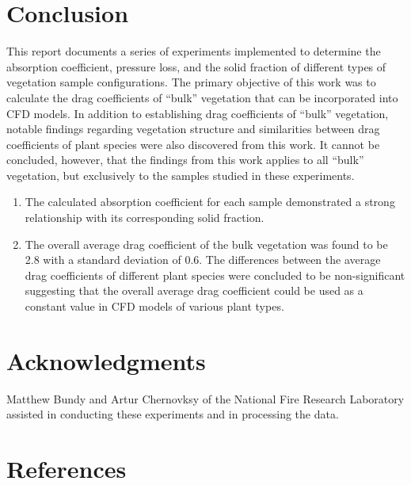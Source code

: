 \documentclass[12pt]{article}
\begin{document}
\section*{Conclusion}
This report documents a series of experiments implemented to determine the absorption coefficient, pressure loss, and the solid fraction of different types of vegetation sample configurations. The primary objective of this work was to calculate the drag coefficients of ``bulk'' vegetation that can be incorporated into CFD models. In addition to establishing drag coefficients of ``bulk''  vegetation, notable findings regarding vegetation structure and similarities between drag coefficients of plant species were also discovered from this work. It cannot be concluded, however, that the findings from this work applies to all ``bulk'' vegetation, but exclusively to the samples studied in these experiments.

\begin{enumerate}
  \item The calculated absorption coefficient for each sample demonstrated a strong relationship with its corresponding solid fraction.
  \item The overall average drag coefficient of the bulk vegetation was found to be 2.8 with a standard deviation of 0.6. The differences between the average drag coefficients of different plant species were concluded to be non-significant suggesting that the overall average drag coefficient could be used as a constant value in CFD models of various plant types.
\end{enumerate}

\section*{Acknowledgments}

\noindent Matthew Bundy and Artur Chernovksy of the National Fire Research Laboratory assisted in conducting these experiments and in processing the data.   \\
\pagebreak
\section*{References}


\end{document}
